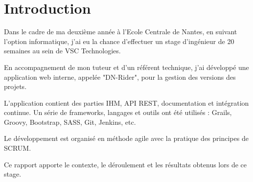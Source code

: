 \chapter{Introduction}
\label{chap:Introduction}

Dans le cadre de ma deuxième année à l'Ecole Centrale de Nantes, en suivant l'option informatique,
j'ai eu la chance d'effectuer un stage d'ingénieur de 20 semaines au sein de VSC Technologies.

En accompagnement de mon tuteur et d'un référent technique,
j'ai développé une application web interne, appelée "DN-Rider", pour la gestion des versions des projets.

L'application contient des parties IHM, API REST, documentation et intégration continue.
Un série de frameworks, langages et outils ont été utilisés : Grails, Groovy, Bootstrap, SASS, Git, Jenkins, etc.

Le développement est organisé en méthode agile avec la pratique des principes de SCRUM.

Ce rapport apporte le contexte, le déroulement et les résultats obtenus lors de ce stage.
